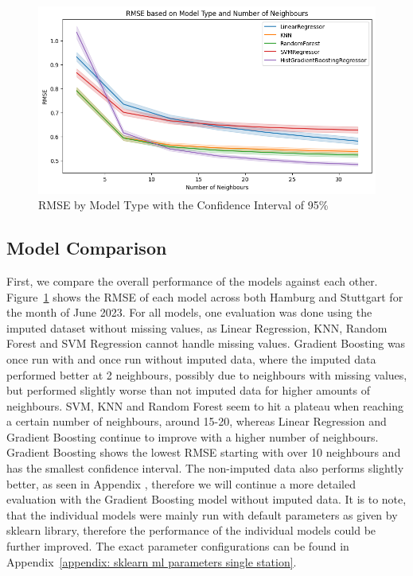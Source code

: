 \begin{figure}[ht]
  \centering
  \includegraphics[width=1\textwidth]{images/rmse_by_model_type.png}
  \caption{RMSE by Model Type with the Confidence Interval of 95\%}
  \label{fig:rmse by model type}
\end{figure}

\subsection{Model Comparison}

First, we compare the overall performance of the models against each other. Figure~\ref{fig:rmse by model type} shows the RMSE of each model across both Hamburg and Stuttgart for the month of June 2023. For all models, one evaluation was done using the imputed dataset without missing values, as Linear Regression, KNN, Random Forest and SVM Regression cannot handle missing values. Gradient Boosting was once run with and once run without imputed data, where the imputed data performed better at 2 neighbours, possibly due to neighbours with missing values, but performed slightly worse than not imputed data for higher amounts of neighbours. SVM, KNN and Random Forest seem to hit a plateau when reaching a certain number of neighbours, around 15-20, whereas Linear Regression and Gradient Boosting continue to improve with a higher number of neighbours.\\
Gradient Boosting shows the lowest RMSE starting with over 10 neighbours and has the smallest confidence interval. The non-imputed data also performs slightly better, as seen in Appendix %
, therefore we will continue a more detailed evaluation with the Gradient Boosting model without imputed data. It is to note, that the individual models were mainly run with default parameters as given by sklearn library, therefore the performance of the individual models could be further improved. The exact parameter configurations can be found in Appendix~\ref{appendix: sklearn ml parameters single station}.

